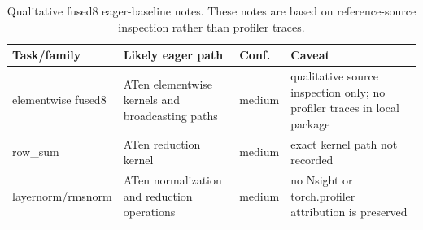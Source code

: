 \begin{table}[htbp]
\centering
\caption{Qualitative fused8 eager-baseline notes. These notes are based on reference-source inspection rather than profiler traces.}
\label{tab:fused8-eager-notes}
\scriptsize
\begin{tabularx}{\linewidth}{l X l X}
\toprule
Task/family & Likely eager path & Conf. & Caveat \\
\midrule
elementwise fused8 & ATen elementwise kernels and broadcasting paths & medium & qualitative source inspection only; no profiler traces in local package \\
row\_sum & ATen reduction kernel & medium & exact kernel path not recorded \\
layernorm/rmsnorm & ATen normalization and reduction operations & medium & no Nsight or torch.profiler attribution is preserved \\
\bottomrule
\end{tabularx}
\end{table}
